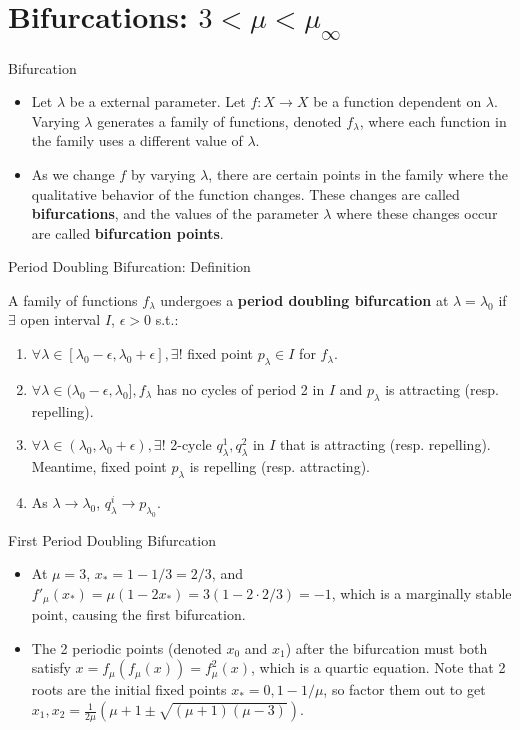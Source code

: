 \documentclass[aspectratio=169]{beamer}
\begin{document}
\section{Bifurcations: $3<\mu< \mu_\infty$}
\frame{\sectionpage}

\begin{frame}{Bifurcation}
\begin{itemize}
    \item Let $\lambda$ be a external parameter. Let $f:X\rightarrow X$ be a function dependent on $\lambda$. Varying $\lambda$ generates a family of functions, denoted $f_\lambda$, where each function in the family uses a different value of $\lambda$. 
    \item As we change $f$ by varying $\lambda$, there are certain points in the family where the qualitative behavior of the function changes. These changes are called \textbf{bifurcations}, and the values of the parameter $\lambda$ where these changes occur are called \textbf{bifurcation points}.
\end{itemize}
\end{frame}

\begin{frame}{Period Doubling Bifurcation: Definition}
\begin{defn}
    A family of functions $f_\lambda$ undergoes a \textbf{period doubling bifurcation} at $\lambda = \lambda_0$ if $\exists$ open interval $I$, $\epsilon >0$ s.t.: 
    \begin{enumerate}
        \item $\forall \lambda \in [\lambda_0-\epsilon, \lambda_0+\epsilon], \exists !$ fixed point $p_\lambda \in I$ for $f_\lambda$.
        \item $\forall \lambda \in (\lambda_0-\epsilon, \lambda_0], f_\lambda$ has no cycles of period 2 in $I$ and $p_\lambda$ is attracting (resp. repelling). 
        \item $\forall \lambda \in (\lambda_0, \lambda_0+\epsilon), \exists !$ 2-cycle $q_\lambda^1, q_\lambda^2$ in $I$ that is attracting (resp. repelling). Meantime, fixed point $p_\lambda$ is repelling (resp. attracting). 
        \item As $\lambda\rightarrow\lambda_0$, $q_\lambda^i \rightarrow p_{\lambda_0}$.
    \end{enumerate}
\end{defn}
\end{frame}

\begin{frame}{First Period Doubling Bifurcation}
\begin{itemize}
    \item At $\mu = 3$, $x_* = 1-1/3 = 2/3$, and $f'_\mu(x_*) = \mu(1-2x_*) = 3(1-2 \cdot 2/3) = -1$, which is a marginally stable point, causing the first bifurcation.
    \item The 2 periodic points (denoted $x_0$ and $x_1$) after the bifurcation must both satisfy $x = f_\mu(f_\mu(x)) = f_\mu^2(x)$, which is a quartic equation. Note that 2 roots are the initial fixed points $x_* = 0, 1-1/\mu$, so factor them out to get $ x_1, x_2 = \frac{1}{2\mu}(\mu+1 \pm \sqrt{(\mu+1)(\mu-3)})$.
\end{itemize}
\end{frame}
\end{document}
